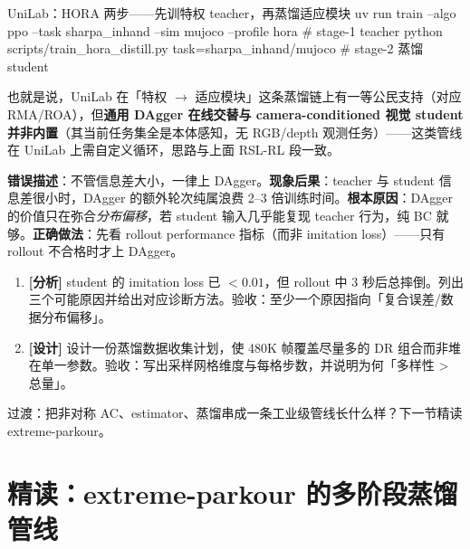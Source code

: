 \begin{codebox}[bash]{UniLab：HORA 两步——先训特权 teacher，再蒸馏适应模块}
uv run train --algo ppo --task sharpa_inhand --sim mujoco --profile hora  # stage-1 teacher
python scripts/train_hora_distill.py task=sharpa_inhand/mujoco            # stage-2 蒸馏 student
\end{codebox}

也就是说，UniLab 在「特权 $\to$ 适应模块」这条蒸馏链上有一等公民支持（对应 RMA/ROA），但\textbf{通用 DAgger 在线交替与 camera-conditioned 视觉 student 并非内置}（其当前任务集全是本体感知，无 RGB/depth 观测任务）——这类管线在 UniLab 上需自定义循环，思路与上面 RSL-RL 段一致。

\begin{pitfall}
\textbf{错误描述}：不管信息差大小，一律上 DAgger。\textbf{现象后果}：teacher 与 student 信息差很小时，DAgger 的额外轮次纯属浪费 2--3 倍训练时间。\textbf{根本原因}：DAgger 的价值只在弥合\emph{分布偏移}，若 student 输入几乎能复现 teacher 行为，纯 BC 就够。\textbf{正确做法}：先看 rollout performance 指标（而非 imitation loss）——只有 rollout 不合格时才上 DAgger。
\end{pitfall}

\begin{practice}[本节练习]
\begin{enumerate}
  \item \textbf{[分析]} student 的 imitation loss 已 $<0.01$，但 rollout 中 3 秒后总摔倒。列出三个可能原因并给出对应诊断方法。验收：至少一个原因指向「复合误差/数据分布偏移」。
  \item \textbf{[设计]} 设计一份蒸馏数据收集计划，使 480K 帧覆盖尽量多的 DR 组合而非堆在单一参数。验收：写出采样网格维度与每格步数，并说明为何「多样性 > 总量」。
\end{enumerate}
\end{practice}

过渡：把非对称 AC、estimator、蒸馏串成一条工业级管线长什么样？下一节精读 extreme-parkour。

\section{精读：extreme-parkour 的多阶段蒸馏管线}
\label{sec:rlmc-priv-parkour}

